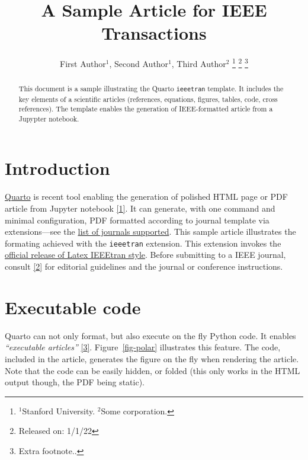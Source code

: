 \documentclass[
  10pt,
  letterpaper,
  journal,
  twoside]{IEEEtran}
\newcommand\muted[1]{%
\bgroup
\hskip0pt\color{black!40!}%
#1%
\egroup
}
\begin{document}
\author{
        First Author\(^1\),     Second
Author\(^1\),     Third Author\(^2\)
    \thanks{\(^1\)Stanford University. \(^2\)Some corporation.}
    \thanks{Released on: 1/1/22}
    \thanks{Extra footnote..}
}


\title{A Sample Article for IEEE Transactions}
\maketitle

\begin{abstract}
    This document is a sample illustrating the Quarto \texttt{ieeetran}
    template. It includes the key elements of a scientific articles
    (references, equations, figures, tables, code, cross references).
    The template enables the generation of IEEE-formatted article from a
    Jupypter notebook.
\end{abstract}

\hypertarget{sec-intro}{%
\section{Introduction}\label{sec-intro}}

\href{https://quarto.org/}{Quarto} is recent tool enabling the
generation of polished HTML page or PDF article from Jupyter notebook
\protect\hyperlink{ref-Close2022-dt}{{[}1{]}}. It can generate, with one
command and minimal configuration, PDF formatted according to journal
template via extensions---see the
\href{https://github.com/quarto-journals/}{list of journals supported}.
This sample article illustrates the formating achieved with the
\texttt{ieeetran} extension. This extension invokes the
\href{https://www.ctan.org/tex-archive/macros/latex/contrib/IEEEtran/}{official
release of Latex IEEEtran style}. Before submitting to a IEEE journal,
consult \protect\hyperlink{ref-Ieee2020-zv}{{[}2{]}} for editorial
guidelines and the journal or conference instructions.

\muted{\lipsum[1-2]}

\hypertarget{executable-code}{%
\section{Executable code}\label{executable-code}}

Quarto can not only format, but also execute on the fly Python code. It
enables \emph{``executable articles''}
\protect\hyperlink{ref-Lasser2020-wo}{{[}3{]}}. Figure~\ref{fig-polar}
illustrates this feature. The code, included in the article, generates
the figure on the fly when rendering the article. Note that the code can
be easily hidden, or folded (this only works in the HTML output though,
the PDF being static).
\end{document}
